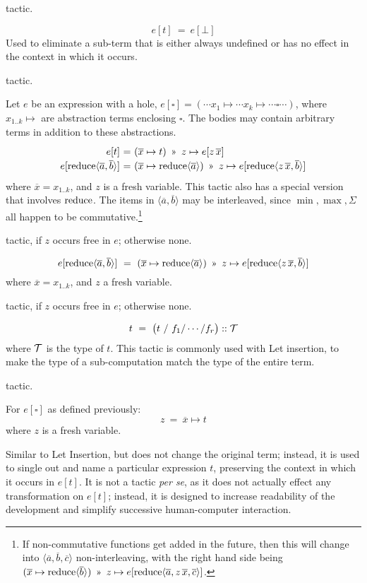 \Obligations tactic.

\[e[t] ~=~ e[\bot]\]
%
Used to eliminate a sub-term that is either always undefined or has no effect
in the context in which it occurs.

\Obligations tactic.

\vspace{3mm}
Let $e$ be an expression with a hole, $e[\square] = (\cdots x_1 \mapsto \cdots x_k\mapsto \cdots \square \cdots)$, 
where $x_{1..k}\mapsto$ are abstraction terms enclosing $\square$. The bodies may contain arbitrary terms
in addition to these abstractions.
%
\[\renewcommand\arraystretch{1.2}
  \begin{array}{@{}r@{}c@{}l@{}}
  e[t] & ~=~ & (\overline{x}\mapsto t) ~\applt~ z\mapsto e[z\,\overline{x}] \\
  e[\reduce \langle\overline{a},\overline{b}\rangle] & ~=~ &
     (\overline{x}\mapsto \reduce\langle\overline{a}\rangle) ~\applt~ z\mapsto e[\reduce\langle z\,\overline{x}, \overline{b}\rangle]
  \end{array}\]
%
where $\overline{x}=x_{1..k}$, and $z$ is a fresh variable.
This tactic also has a special version that involves $\operatorname{reduce}$.
The items in $\langle \overline{a},\overline{b}\rangle$ may be interleaved, since
$\min,\max,\Sigma$ all happen to be commutative.\footnote{If non-commutative functions get added in the future, then this will change into $\langle \overline{a}, \overline{b}, \overline{c}\rangle$ non-interleaving, with the right hand side being $(\overline{x}\mapsto \reduce\langle\overline{b}\rangle) ~\applt~ z\mapsto e[\reduce\langle \overline{a}, z\,\overline{x}, \overline{c}\rangle]$.}

\Obligations tactic, if $z$ occurs free in $e$; otherwise none.

%
\[e[\reduce \langle\overline{a},\overline{b}\rangle] ~=~ 
  (\overline{x}\mapsto \reduce\langle\overline{a}\rangle) ~\applt~ z\mapsto e[\reduce\langle z\,\overline{x}, \overline{b}\rangle]\]
%
where $\overline{x}=x_{1..k}$, and $z$ a fresh variable.

\Obligations tactic, if $z$ occurs free in $e$; otherwise none.

\[t ~=~ \big(t~/~f_1/\cdots/f_r\big) :: \mathcal{T}\]
%
where $\mathcal{T}$ is the type of $t$. This tactic is commonly used with Let insertion,
to make the type of a sub-computation match the type of the entire term.

\Obligations tactic.

\vspace{3mm}
For $e[\square]$ as defined previously:
\[z ~=~ \overline{x}\mapsto t\]
%
where $z$ is a fresh variable.

Similar to Let Insertion, but does not change the original term; instead,
it is used to single out and name a particular expression $t$, preserving the context
in which it occurs in $e[t]$. It is not a tactic {\it per se}, as it does not
actually effect any transformation on $e[t]$; instead, it is designed to increase
readability of the development and simplify successive human-computer interaction.
